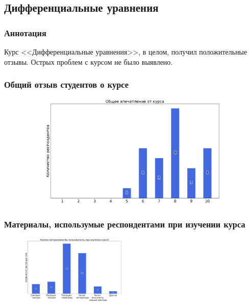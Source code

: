 \subsection{Дифференциальные уравнения}
	
	\subsubsection{Аннотация}

		Курс <<Дифференциальные уравнения>>, в целом, получил положительные отзывы. Острых проблем с курсом не было выявлено.

	\subsubsection{Общий отзыв студентов о курсе}

		\begin{figure}[H]
			\centering
			\begin{subfigure}[b]{0.45\textwidth}
				\centering
				\includegraphics[width=\textwidth]{images/2 course/Дифференциальные уравнения/general-0.png}
			\end{subfigure}
		\end{figure}

	\subsubsection{Материалы, использумые респондентами при изучении курса}

		\begin{figure}[H]
			\centering
			\includegraphics[width = 0.45\textwidth]{images/2 course/Дифференциальные уравнения/materials.png}
		\end{figure}

